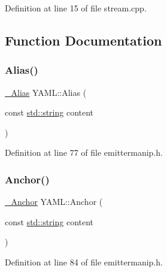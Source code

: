 Definition at line 15 of file stream.\+cpp.



\subsection{Function Documentation}
\mbox{\label{namespace_y_a_m_l_a41c2352843482997c8336b5ac17bf0f4}} 
\subsubsection{\texorpdfstring{Alias()}{Alias()}}
{\footnotesize\ttfamily \mbox{\hyperlink{struct_y_a_m_l_1_1___alias}{\+\_\+\+Alias}} Y\+A\+M\+L\+::\+Alias (\begin{DoxyParamCaption}\item[{const \mbox{\hyperlink{glad_8h_ac83513893df92266f79a515488701770}{std\+::string}}}]{content }\end{DoxyParamCaption})\hspace{0.3cm}{\ttfamily [inline]}}



Definition at line 77 of file emittermanip.\+h.

\mbox{\label{namespace_y_a_m_l_a6f50a59e00212914b4313bf361206079}} 
\subsubsection{\texorpdfstring{Anchor()}{Anchor()}}
{\footnotesize\ttfamily \mbox{\hyperlink{struct_y_a_m_l_1_1___anchor}{\+\_\+\+Anchor}} Y\+A\+M\+L\+::\+Anchor (\begin{DoxyParamCaption}\item[{const \mbox{\hyperlink{glad_8h_ac83513893df92266f79a515488701770}{std\+::string}}}]{content }\end{DoxyParamCaption})\hspace{0.3cm}{\ttfamily [inline]}}



Definition at line 84 of file emittermanip.\+h.

\mbox{\label{namespace_y_a_m_l_a6a8d7258e92d4f2150869d90a45addc1}} 
